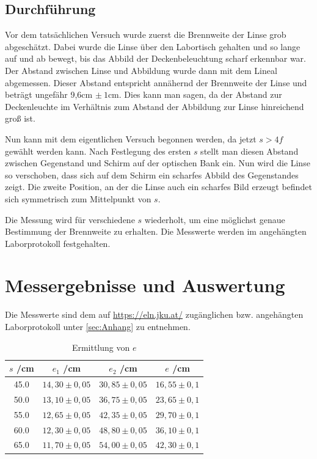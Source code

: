 \documentclass[a4paper,12pt]{article}
\begin{document}
\subsection{Durchführung}
\label{sec:Durchfuehrung}

Vor dem tatsächlichen Versuch wurde zuerst die Brennweite der Linse grob abgeschätzt.
Dabei wurde die Linse über den Labortisch gehalten und so lange auf und ab bewegt, bis das
Abbild der Deckenbeleuchtung scharf erkennbar war. Der Abstand zwischen Linse und Abbildung
wurde dann mit dem Lineal abgemessen. Dieser Abstand entspricht annähernd der Brennweite
der Linse und beträgt ungefähr 9,6cm $\pm\:1\mathrm{cm}$. Dies kann man sagen, da der Abstand
zur Deckenleuchte im Verhältnis zum Abstand der Abbildung zur Linse hinreichend groß ist.

Nun kann mit dem eigentlichen Versuch begonnen werden, da jetzt $s>4f$ gewählt werden kann.
Nach Festlegung des ersten $s$ stellt man diesen Abstand zwischen Gegenstand und Schirm auf der
optischen Bank ein. Nun wird die Linse so verschoben, dass sich auf dem Schirm ein scharfes
Abbild des Gegenstandes zeigt. Die zweite Position, an der die Linse auch ein scharfes Bild erzeugt
befindet sich symmetrisch zum Mittelpunkt von $s$.

Die Messung wird für verschiedene $s$ wiederholt, um eine möglichst genaue Bestimmung der Brennweite
zu erhalten. Die Messwerte werden im angehängten Laborprotokoll festgehalten.

\section{Messergebnisse und Auswertung}

Die Messwerte sind dem auf \url{https://eln.jku.at/} zugänglichen bzw. angehängten Laborprotokoll unter \ref{sec:Anhang} zu entnehmen.         %

\begin{table}[H]
	\centering
	\begin{tabular}{c|c|c|c}
		$s$ /cm & $e_1$ /cm & $e_2$ /cm & $e$ /cm \\ \hline
		45.0 & $14,30\pm0,05$ & $30,85\pm0,05$ & $16,55\pm0,1$ \\
		50.0 & $13,10\pm0,05$ & $36,75\pm0,05$ & $23,65\pm0,1$ \\
		55.0 & $12,65\pm0,05$ & $42,35\pm0,05$ & $29,70\pm0,1$ \\
		60.0 & $12,30\pm0,05$ & $48,80\pm0,05$ & $36,10\pm0,1$ \\
		65.0 & $11,70\pm0,05$ & $54,00\pm0,05$ & $42,30\pm0,1$ \\
	\end{tabular}
    \caption{Ermittlung von $e$}
\end{table}
\end{document}
